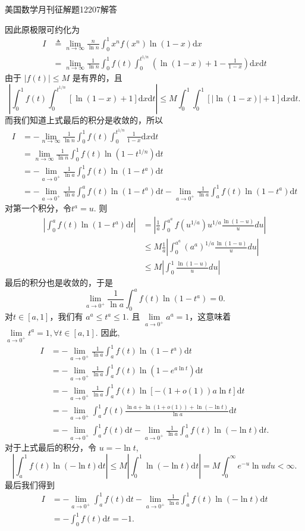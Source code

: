 \documentclass[UTF8,no-math,12pt,openany,table,dvipsnames,svgnames]{book}
\newcommand{\hei}{\CJKfamily{hei}}
\newenvironment{solve}{\par\indent{\hei 解}\hspace{1em}}{\par}
\renewcommand{\le}{\leqslant}
\begin{document}
\begin{MYBOX}[colbacktitle=blue]{美国数学月刊征解题12207解答}
\begin{solve}
因此原极限可约化为
\begin{align*}
  I & \triangleq \lim_{n\to\infty}\frac n{\ln n}\int_0^1x^nf(x^n)\ln(1-x)\mathrm dx \\
  & = \lim_{n\to\infty}\frac 1{\ln n}\int_0^1 f(t)  \int_0^{t^{1/n}}\left( \ln(1-x) + 1 - \frac1{1-x} \right)\mathrm dx \mathrm dt
\end{align*}
由于 $|f(t)|\le M$ 是有界的，且
\[
  \left| \int_0^1 f(t)  \int_0^{t^{1/n}} [\ln(1-x) + 1]\mathrm dx \mathrm dt  \right| \le
  M \int_0^1  \int_0^1 [|\ln(1-x)| + 1]\mathrm dx \mathrm dt.
\]
而我们知道上式最后的积分是收敛的，所以
\begin{align*}
  I & = - \lim_{n\to\infty}\frac 1{\ln n}\int_0^1 f(t)  \int_0^{t^{1/n}}\frac1{1-x}\mathrm dx \mathrm dt \\
    & =  \lim_{n\to\infty}\frac 1{\ln n}\int_0^1 f(t)\ln(1-t^{1/n}) \mathrm dt \\
    & = - \lim_{a\to0^+} \frac1{\ln a}\int_0^1f(t)\ln(1-t^a) \mathrm dt\\
    & = - \lim_{a\to0^+} \frac1{\ln a}\int_0^af(t)\ln(1-t^a) \mathrm dt - \lim_{a\to0^+} \frac1{\ln a}\int_a^1f(t)\ln(1-t^a) \mathrm dt
\end{align*}
对第一个积分，令$t^a=u$. 则
\begin{align*}
  \left| \int_0^af(t)\ln(1-t^a)\mathrm dt \right| & = \left| \frac1a\int_0^{a^a}f(u^{1/a}) u^{1/a}\frac{\ln(1-u)}u du  \right| \\
  & \le M\frac1a\left| \int_0^{a^a} (a^a)^{1/a}\frac{\ln(1-u)}u du  \right| \\
  & \le M  \left| \int_0^1 \frac{\ln(1-u)}u du  \right|
\end{align*}
最后的积分也是收敛的，于是
\[
  \lim_{a\to0^+} \frac1{\ln a}\int_0^af(t)\ln(1-t^a) = 0.
\]
对$t\in[a,1]$，我们有 $a^a\le t^a \le 1$.  且 $\lim\limits_{a\to0^+}a^a=1$，这意味着 $\lim\limits_{a\to0^+}t^a=1,\forall t\in[a,1]$. 因此,
\begin{align*}
  I & = - \lim_{a\to0^+} \frac1{\ln a}\int_a^1f(t)\ln(1-t^a) \mathrm dt \\
  & = - \lim_{a\to0^+} \frac1{\ln a}\int_a^1f(t)
    \ln (1-e^{a\ln t})\mathrm dt \\
  & = - \lim_{a\to0^+} \frac1{\ln a}\int_a^1f(t)
    \ln [-(1+o(1))a\ln t]\mathrm dt \\
  & = - \lim_{a\to0^+}\int_a^1 f(t)
    \frac{\ln a + \ln(1+o(1)) + \ln(-\ln t)}{\ln a} \mathrm dt\\
  & = -\lim_{a\to0^+}\int_a^1 f(t) \mathrm dt - \lim_{a\to0^+}\frac1{\ln a}\int_a^1 f(t) \ln(-\ln t) \mathrm dt.
\end{align*}
对于上式最后的积分，令 $u=-\ln t$,
\[
  \left| \int_a^1 f(t) \ln(-\ln t) \mathrm dt \right| \le M
  \left| \int_0^1 \ln(-\ln t) \mathrm dt \right| = M\int_0^\infty e^{-u} \ln u du<\infty.
\]
最后我们得到
\begin{align*}
  I & = -\lim_{a\to0^+}\int_a^1 f(t) \mathrm dt - \lim_{a\to0^+}\frac1{\ln a}\int_a^1 f(t) \ln(-\ln t) \mathrm dt\\
  & = -\int_0^1f(t)\mathrm dt = -1.
\end{align*}
\end{solve}
\end{MYBOX}
\end{document}

